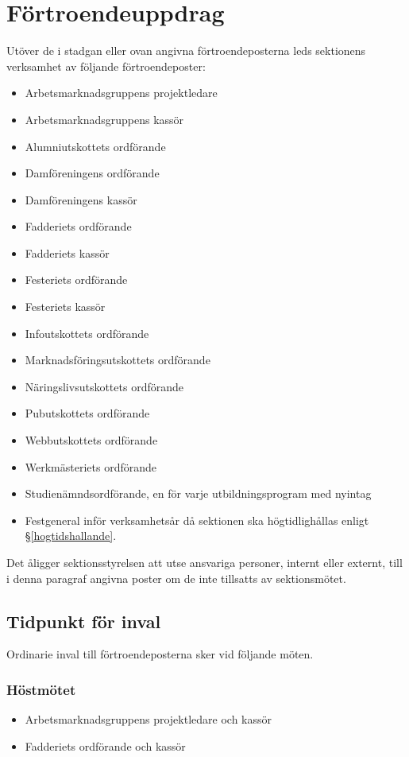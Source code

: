 \documentclass{datateknologsektionen-document}
\begin{document}
\section{Förtroendeuppdrag}
Utöver de i stadgan eller ovan angivna förtroendeposterna leds sektionens verksamhet av följande förtroendeposter:
\begin{itemize}
  \item Arbetsmarknadsgruppens projektledare
  \item Arbetsmarknadsgruppens kassör
  \item Alumniutskottets ordförande
  \item Damföreningens ordförande
  \item Damföreningens kassör
  \item Fadderiets ordförande
  \item Fadderiets kassör
  \item Festeriets ordförande
  \item Festeriets kassör
  \item Infoutskottets ordförande
  \item Marknadsföringsutskottets ordförande
  \item Näringslivsutskottets ordförande
  \item Pubutskottets ordförande
  \item Webbutskottets ordförande
  \item Werkmästeriets ordförande
  \item Studienämndsordförande, en för varje utbildningsprogram med nyintag
  \item Festgeneral inför verksamhetsår då sektionen ska högtidlighållas enligt \S \ref{hogtidshallande}.
\end{itemize}
Det åligger sektionsstyrelsen att utse ansvariga personer, internt eller externt, till i denna paragraf angivna poster om de inte tillsatts av sektionsmötet.

\subsection{Tidpunkt för inval}
Ordinarie inval till förtroendeposterna sker vid följande möten.

\subsubsection{Höstmötet}
\begin{itemize}
  \item Arbetsmarknadsgruppens projektledare och kassör
  \item Fadderiets ordförande och kassör
\end{itemize}
\end{document}
